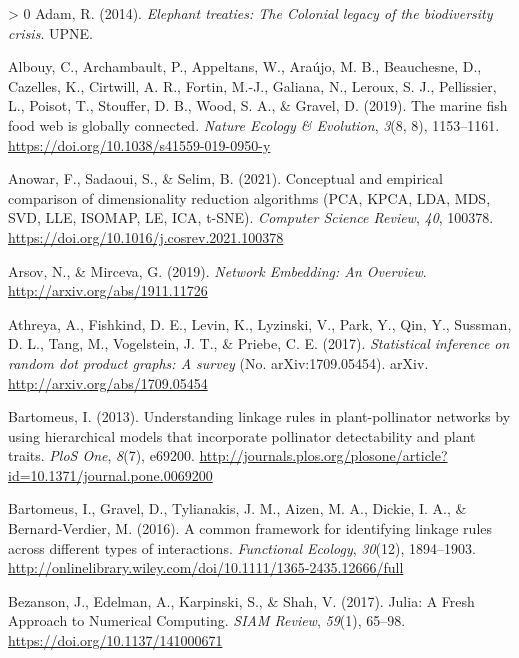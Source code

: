 \documentclass[11pt]{article}
\newlength{\cslhangindent}
\newenvironment{CSLReferences}[3] %
 {%
  \setlength{\parindent}{0pt}
  \ifodd #1 \everypar{\setlength{\hangindent}{\cslhangindent}}\ignorespaces\fi
  \ifnum #2 > 0
  \setlength{\parskip}{#2\baselineskip}
  \fi
 }%
 {}
\begin{document}
\hypertarget{refs}{}
\begin{CSLReferences}{1}{0}
\leavevmode\hypertarget{ref-Adam2014EleTre}{}%
Adam, R. (2014). \emph{Elephant treaties: The Colonial legacy of the
biodiversity crisis}. UPNE.

\leavevmode\hypertarget{ref-Albouy2019MarFis}{}%
Albouy, C., Archambault, P., Appeltans, W., Araújo, M. B., Beauchesne,
D., Cazelles, K., Cirtwill, A. R., Fortin, M.-J., Galiana, N., Leroux,
S. J., Pellissier, L., Poisot, T., Stouffer, D. B., Wood, S. A., \&
Gravel, D. (2019). The marine fish food web is globally connected.
\emph{Nature Ecology \& Evolution}, \emph{3}(8, 8), 1153--1161.
\url{https://doi.org/10.1038/s41559-019-0950-y}

\leavevmode\hypertarget{ref-Anowar2021ConEmp}{}%
Anowar, F., Sadaoui, S., \& Selim, B. (2021). Conceptual and empirical
comparison of dimensionality reduction algorithms (PCA, KPCA, LDA, MDS,
SVD, LLE, ISOMAP, LE, ICA, t-SNE). \emph{Computer Science Review},
\emph{40}, 100378. \url{https://doi.org/10.1016/j.cosrev.2021.100378}

\leavevmode\hypertarget{ref-Arsov2019NetEmb}{}%
Arsov, N., \& Mirceva, G. (2019). \emph{Network Embedding: An Overview}.
\url{http://arxiv.org/abs/1911.11726}

\leavevmode\hypertarget{ref-Athreya2017StaInf}{}%
Athreya, A., Fishkind, D. E., Levin, K., Lyzinski, V., Park, Y., Qin,
Y., Sussman, D. L., Tang, M., Vogelstein, J. T., \& Priebe, C. E.
(2017). \emph{Statistical inference on random dot product graphs: A
survey} (No. arXiv:1709.05454). arXiv.
\url{http://arxiv.org/abs/1709.05454}

\leavevmode\hypertarget{ref-Bartomeus2013UndLin}{}%
Bartomeus, I. (2013). Understanding linkage rules in plant-pollinator
networks by using hierarchical models that incorporate pollinator
detectability and plant traits. \emph{PloS One}, \emph{8}(7), e69200.
\url{http://journals.plos.org/plosone/article?id=10.1371/journal.pone.0069200}

\leavevmode\hypertarget{ref-Bartomeus2016ComFra}{}%
Bartomeus, I., Gravel, D., Tylianakis, J. M., Aizen, M. A., Dickie, I.
A., \& Bernard-Verdier, M. (2016). A common framework for identifying
linkage rules across different types of interactions. \emph{Functional
Ecology}, \emph{30}(12), 1894--1903.
\url{http://onlinelibrary.wiley.com/doi/10.1111/1365-2435.12666/full}

\leavevmode\hypertarget{ref-Bezanson2017JulFre}{}%
Bezanson, J., Edelman, A., Karpinski, S., \& Shah, V. (2017). Julia: A
Fresh Approach to Numerical Computing. \emph{SIAM Review}, \emph{59}(1),
65--98. \url{https://doi.org/10.1137/141000671}


\end{CSLReferences}
\end{document}
